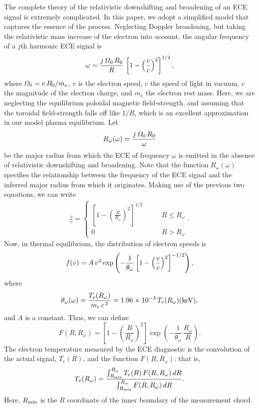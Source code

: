 \documentclass[12pt,prb,aps]{revtex4-1}
\begin{document}
The complete theory of the relativistic downshifting and broadening of an ECE signal  is extremely complicated.\cite{ece1,ece2} In this
paper, we adopt a simplified model that captures the essence of the process. Neglecting Doppler broadening, but taking the relativistic mass
increase of the electron into account,  the angular frequency of a $j$th harmonic ECE signal is\,\cite{plasma}
\begin{equation}
\omega = \frac{j\,{\mit\Omega}_0\,R_0}{R}\,\left[1-\left(\frac{v}{c}\right)^2\right]^{1/2},
\end{equation}
where ${\mit\Omega}_0=e\,B_0/m_e$, $v$ is the electron speed, $c$ the speed of light in vacuum, $e$ the magnitude of the electron charge, 
and $m_e$  the electron rest mass. Here, we are neglecting the equilibrium poloidal magnetic field-strength, and assuming that the toroidal
field-strength falls off like $1/R$, which is an excellent approximation in our model plasma equilibrium. Let
\begin{equation}
R_\omega(\omega) = \frac{j\,{\mit\Omega}_0\,R_0}{\omega}
\end{equation}
be the major radius from which the ECE of frequency $\omega$ is emitted  in the absence of relativistic downshifting and broadening. 
Note that the function $R_\omega(\omega)$ specifies the relationship between the frequency of the ECE signal and the inferred major radius from
which it originates. Making use of the previous two equations, we can write
\begin{align}
\frac{v}{c} =\left\{\begin{array}{ccc}\left[1-\left(\frac{R}{R_\omega}\right)^2\right]^{1/2} &~~~~~&R\leq R_\omega\\[0.5ex]
0&&R>R_\omega
\end{array}\right..
\end{align}
Now, in thermal equilibrium, the distribution of electron speeds is\,\cite{stat}
\begin{equation}
f(v)= A\,v^2\,{\rm exp}\left(-\frac{1}{\theta_\omega}\left[1-\left(\frac{v}{c}\right)^2\right]^{-1/2}\right),
\end{equation}
where
\begin{equation}
\theta_\omega(\omega) = \frac{T_e(R_\omega)}{m_e\,c^{\,2}} = 1.96\times 10^{-3}\,T_e(R_\omega)({\rm keV}),
\end{equation}
and $A$ is a constant. 
Thus, we can define
\begin{equation}
F(R,R_\omega) = \left[1-\left(\frac{R}{R_\omega}\right)^2\right]\exp\!\left(-\frac{1}{\theta_\omega}\,\frac{R_\omega}{R}\right).
\end{equation}
The electron temperature measured by the ECE diagnostic is the convolution of the actual signal, $T_e(R)$,  and the function $F(R,R_\omega)$: that is, 
\begin{equation}
T_e(R_\omega) = \frac{\int_{R_{\rm min}}^{R_\omega} T_e(R)\,F(R,R_\omega)\,dR}  {\int_{R_{\rm min}}^{R_\omega} F(R,R_\omega)\,dR}.
\end{equation}
Here, $R_{\rm min}$ is the $R$ coordinate of the inner boundary of the measurement chord.
\end{document}
